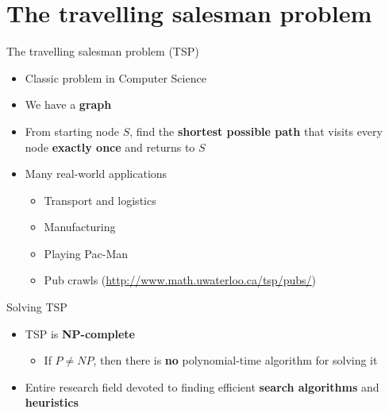 \part{The travelling salesman problem}
\frame{\partpage}

\begin{frame}{The travelling salesman problem (TSP)}
	\begin{itemize}
		\pause\item Classic problem in Computer Science
		\pause\item We have a \textbf{graph}
		\pause\item From starting node $S$, find the \textbf{shortest possible path} that visits every node
			\textbf{exactly once} and returns to $S$
		\pause\item Many real-world applications
			\begin{itemize}
				\pause\item Transport and logistics
				\pause\item Manufacturing
				\pause\item Playing Pac-Man
				\pause\item Pub crawls (\url{http://www.math.uwaterloo.ca/tsp/pubs/})
			\end{itemize}
	\end{itemize}
\end{frame}

\begin{frame}{Solving TSP}
	\begin{itemize}
		\pause\item TSP is \textbf{NP-complete}
			\begin{itemize}
				\pause\item If $P \neq NP$, then there is \textbf{no} polynomial-time algorithm
					for solving it
			\end{itemize}
		\pause\item Entire research field devoted to finding efficient \textbf{search algorithms} and \textbf{heuristics}
	\end{itemize}
\end{frame}
